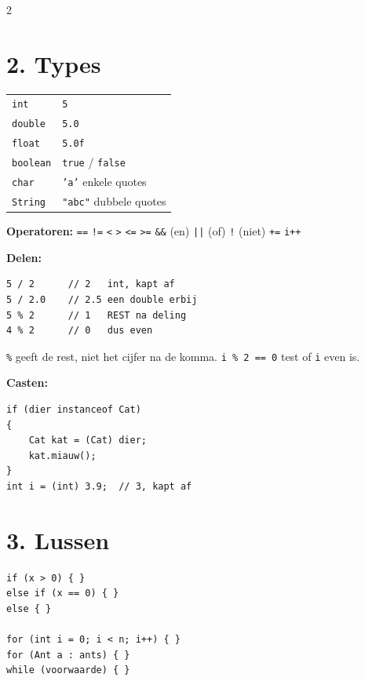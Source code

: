 \documentclass[12pt,a4paper]{extarticle}
\begin{document}
\begin{multicols}{2}
    \section{2. Types}
    \begin{center}
        \small
        \begin{tabular}{@{}ll@{}}
            \toprule
            \texttt{int}     & \texttt{5}                     \\
            \texttt{double}  & \texttt{5.0}                   \\
            \texttt{float}   & \texttt{5.0f}                  \\
            \texttt{boolean} & \texttt{true} / \texttt{false} \\
            \texttt{char}    & \texttt{'a'} enkele quotes     \\
            \texttt{String}  & \texttt{"abc"} dubbele quotes  \\
            \bottomrule
        \end{tabular}
    \end{center}

    \textbf{Operatoren:} \texttt{==} \texttt{!=} \texttt{<} \texttt{>} \texttt{<=}
    \texttt{>=} \quad \texttt{\&\&} (en) \quad \texttt{||} (of) \quad \texttt{!}
    (niet) \quad \texttt{+=} \quad \texttt{i++}

    \textbf{Delen:}
    \begin{lstlisting}
5 / 2      // 2   int, kapt af
5 / 2.0    // 2.5 een double erbij
5 % 2      // 1   REST na deling
4 % 2      // 0   dus even
\end{lstlisting}
    \texttt{\%} geeft de rest, niet het cijfer na de komma.
    \texttt{i \% 2 == 0} test of \texttt{i} even is.

    \textbf{Casten:}
    \begin{lstlisting}
if (dier instanceof Cat)
{
    Cat kat = (Cat) dier;
    kat.miauw();
}
int i = (int) 3.9;  // 3, kapt af
\end{lstlisting}

    \section{3. Lussen}
    \begin{lstlisting}
if (x > 0) { }
else if (x == 0) { }
else { }

for (int i = 0; i < n; i++) { }
for (Ant a : ants) { }
while (voorwaarde) { }


\end{lstlisting}
\end{multicols}
\end{document}
